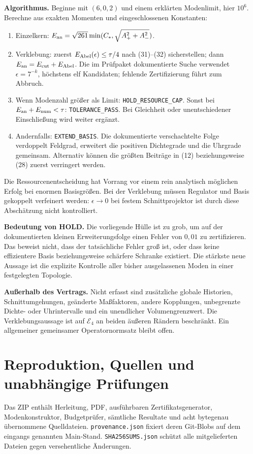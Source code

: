 \documentclass[10pt,a4paper]{article}
\begin{document}
\textbf{Algorithmus.} Beginne mit $(6,0,2)$ und einem erklärten Modenlimit,
hier $10^6$. Berechne aus exakten Momenten und eingeschlossenen Konstanten:
\begin{enumerate}
 \item Einzelkern: $E_{\rm an}=\sqrt{261}\min(C_*,\sqrt{A_+^2+A_-^2})$.
 \item Verklebung: zuerst $E_{\rm Abel}(\epsilon)\le\tau/4$
 nach (31)--(32) sicherstellen; dann $E_{\rm an}=E_{\rm cut}+E_{\rm Abel}$.
 Die im Prüfpaket dokumentierte Suche verwendet $\epsilon=7^{-k}$,
 höchstens elf Kandidaten; fehlende Zertifizierung führt zum Abbruch.
 \item Wenn Modenzahl größer als Limit: \texttt{HOLD\_RESOURCE\_CAP}.
 Sonst bei $E_{\rm an}+E_{\rm num}<\tau$: \texttt{TOLERANCE\_PASS}.
 Bei Gleichheit oder unentschiedener Einschließung wird weiter ergänzt.
 \item Andernfalls: \texttt{EXTEND\_BASIS}. Die dokumentierte verschachtelte
 Folge verdoppelt Feldgrad, erweitert die positiven Dichtegrade und
 die Uhrgrade gemeinsam. Alternativ können die größten Beiträge in
 (12) beziehungsweise (28) zuerst verringert werden.
\end{enumerate}
Die Ressourcenentscheidung hat Vorrang vor einem rein analytisch möglichen
Erfolg bei enormen Basisgrößen. Bei der Verklebung müssen Regulator und
Basis gekoppelt verfeinert werden: $\epsilon\to0$ bei festem Schnittprojektor
ist durch diese Abschätzung nicht kontrolliert.

\textbf{Bedeutung von HOLD.} Die vorliegende Hülle ist zu grob, um auf der
dokumentierten kleinen Erweiterungsfolge einen Fehler von $0{,}01$ zu
zertifizieren. Das beweist nicht, dass der tatsächliche Fehler groß ist,
oder dass keine effizientere Basis beziehungsweise schärfere Schranke
existiert. Die stärkste neue Aussage ist die explizite Kontrolle aller
bisher ausgelassenen Moden in einer festgelegten Topologie.

\textbf{Außerhalb des Vertrags.} Nicht erfasst sind zusätzliche globale
Historien, Schnittumgehungen, geänderte Maßfaktoren, andere Kopplungen,
unbegrenzte Dichte- oder Uhrintervalle und ein unendlicher Volumengrenzwert.
Die Verklebungsaussage ist auf $\mathcal E_4$ an beiden äußeren Rändern
beschränkt. Ein allgemeiner gemeinsamer Operatornormsatz bleibt offen.
\newpage

\section{Reproduktion, Quellen und unabhängige Prüfungen}
Das ZIP enthält Herleitung, PDF, ausführbaren Zertifikatsgenerator,
Modenkonstruktor, Budgetprüfer, sämtliche Resultate und acht bytegenau
übernommene Quelldateien. \texttt{provenance.json} fixiert deren Git-Blobs
auf dem eingangs genannten Main-Stand. \texttt{SHA256SUMS.json} schützt
alle mitgelieferten Dateien gegen versehentliche Änderungen.
\end{document}
